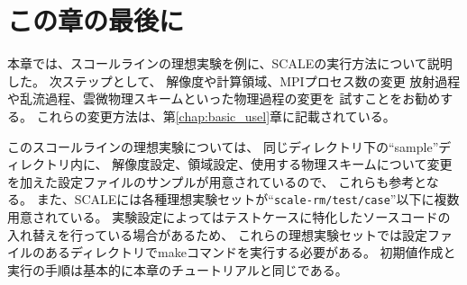 \section{この章の最後に} \label{sec:ideal_exp_last}

本章では、スコールラインの理想実験を例に、SCALEの実行方法について説明した。
次ステップとして、
解像度や計算領域、MPIプロセス数の変更
放射過程や乱流過程、雲微物理スキームといった物理過程の変更を
試すことをお勧めする。
これらの変更方法は、第\ref{chap:basic_usel}章に記載されている。

このスコールラインの理想実験については、
同じディレクトリ下の``sample''ディレクトリ内に、
解像度設定、領域設定、使用する物理スキームについて変更を加えた設定ファイルのサンプルが用意されているので、
これらも参考となる。
また、SCALEには各種理想実験セットが``\verb|scale-rm/test/case|''以下に複数用意されている。
実験設定によってはテストケースに特化したソースコードの入れ替えを行っている場合があるため、
これらの理想実験セットでは設定ファイルのあるディレクトリでmakeコマンドを実行する必要がある。
初期値作成と実行の手順は基本的に本章のチュートリアルと同じである。
